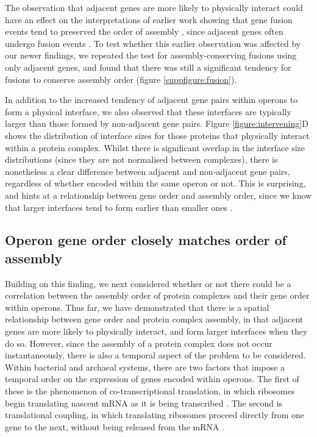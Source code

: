 \documentclass[a4paper,11pt,twoside,openright]{scrbook}
\begin{document}
The observation that adjacent genes are more likely to physically interact could have an effect on the interpretations of earlier work showing that gene fusion events tend to preserved the order of assembly \cite{Marsh2013}, since adjacent genes often undergo fusion events \cite{Pasek2006}. To test whether this earlier observation was affected by our newer findings, we repeated the test for assembly-conserving fusions using only adjacent genes, and found that there was still a significant tendency for fusions to conserve assembly order (figure \ref{suppfigure:fusion}).

In addition to the increased tendency of adjacent gene pairs within operons to form a physical interface, we also observed that these interfaces are typically larger than those formed by non-adjacent gene pairs. Figure \ref{figure:intervening}D shows the distribution of interface sizes for those proteins that physically interact within a protein complex. Whilst there is significant overlap in the interface size distributions (since they are not normalised between complexes), there is nonetheless a clear difference between adjacent and non-adjacent gene pairs, regardless of whether encoded within the same operon or not. This is surprising, and hints at a relationship between gene order and assembly order, since we know that larger interfaces tend to form earlier than smaller ones \cite{Levy2008,Marsh2013,Macek2017}.

\subsection{Operon gene order closely matches order of assembly}
Building on this finding, we next considered whether or not there could be a correlation between the assembly order of protein complexes and their gene order within operons. Thus far, we have demonstrated that there is a spatial relationship between gene order and protein complex assembly, in that adjacent genes are more likely to physically interact, and form larger interfaces when they do so. However, since the assembly of a protein complex does not occur instantaneously, there is also a temporal aspect of the problem to be considered. Within bacterial and archaeal systems, there are two factors that impose a temporal order on the expression of genes encoded within operons. The first of these is the phenomenon of co-transcriptional translation, in which ribosomes begin translating nascent mRNA as it is being transcribed \cite{Byrne1964,Gowrishankar2004,Kohler2017}. The second is translational coupling, in which translating ribosomes proceed directly from one gene to the next, without being released from the mRNA \cite{Oppenheim1980,Levin-Karp2013}.
\end{document}
